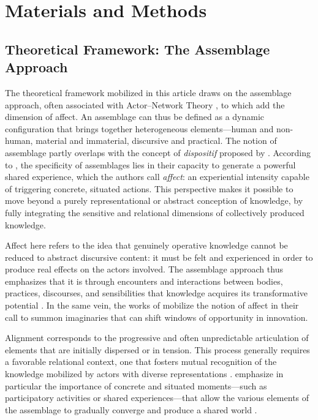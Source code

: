 \documentclass{article}
\begin{document}
\section{Materials and Methods}
\subsection{Theoretical Framework: The Assemblage Approach}

The theoretical framework mobilized in this article draws on the assemblage approach, often associated with Actor–Network Theory \parencite{callon_techno-economic_1990, goulet_characterizing_2021}, to which \textcite{hertz_knowledge_2025} add the dimension of affect. An assemblage can thus be defined as a dynamic configuration that brings together heterogeneous elements—human and non-human, material and immaterial, discursive and practical. The notion of assemblage partly overlaps with the concept of \textit{dispositif} proposed by \textcite{foucault_jeu_1977}. According to \textcite{hertz_knowledge_2025}, the specificity of assemblages lies in their capacity to generate a powerful shared experience, which the authors call \textit{affect}: an experiential intensity capable of triggering concrete, situated actions. This perspective makes it possible to move beyond a purely representational or abstract conception of knowledge, by fully integrating the sensitive and relational dimensions of collectively produced knowledge.  

Affect here refers to the idea that genuinely operative knowledge cannot be reduced to abstract discursive content: it must be felt and experienced in order to produce real effects on the actors involved. The assemblage approach thus emphasizes that it is through encounters and interactions between bodies, practices, discourses, and sensibilities that knowledge acquires its transformative potential \parencite{bessy_experts_1995}. In the same vein, the works of \textcite{jasanoff_constitutional_2011, beck_governance_2021} mobilize the notion of affect in their call to summon imaginaries that can shift windows of opportunity in innovation.  

Alignment corresponds to the progressive and often unpredictable articulation of elements that are initially dispersed or in tension. This process generally requires a favorable relational context, one that fosters mutual recognition of the knowledge mobilized by actors with diverse representations \parencite{geels_typology_2007}. \textcite{jasanoff_constitutional_2011, hertz_knowledge_2025} emphasize in particular the importance of concrete and situated moments—such as participatory activities or shared experiences—that allow the various elements of the assemblage to gradually converge and produce a shared world \parencite{arendt_condition_1957}.  
\end{document}
